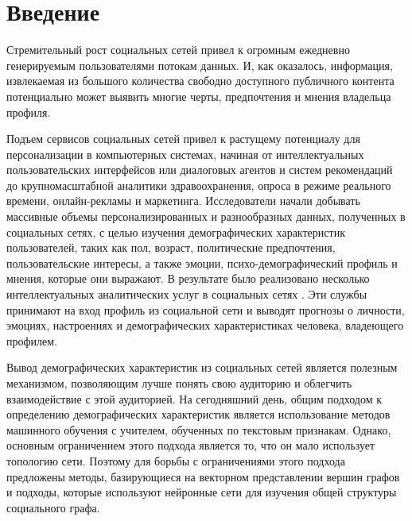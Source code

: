 \section{Введение}
Стремительный рост социальных сетей привел к огромным ежедневно генерируемым пользователями потокам данных. И, как оказалось, информация, извлекаемая из большого количества свободно доступного публичного контента потенциально может выявить многие черты, предпочтения и мнения владельца профиля.

Подъем сервисов социальных сетей привел к растущему потенциалу
для персонализации в компьютерных системах, начиная от
интеллектуальных пользовательских интерфейсов или диалоговых агентов и
систем рекомендаций до крупномасштабной аналитики здравоохранения,
опроса в режиме реального времени, онлайн-рекламы и маркетинга.
Исследователи начали добывать массивные объемы персонализированных и
разнообразных данных, полученных в социальных сетях, с целью изучения
демографических характеристик пользователей, таких как пол, возраст,
политические предпочтения, пользовательские
интересы, а также эмоции, психо-демографический профиль и мнения, которые они выражают. В результате
было реализовано несколько интеллектуальных аналитических услуг в
социальных сетях \cite{ApplyMagicSauce, PersonalityInsights}. Эти службы принимают на вход профиль из социальной
сети и выводят прогнозы о личности, эмоциях, настроениях и
демографических характеристиках человека, владеющего профилем.

Вывод демографических характеристик из социальных сетей является полезным механизмом, позволяющим лучше понять свою аудиторию и облегчить взаимодействие с этой аудиторией.  На сегодняшний день, общим подходом к определению демографических характеристик является использование методов машинного обучения с учителем, обученных по текстовым признакам. Однако, основным ограничением этого подхода является то, что он мало использует топологию сети. Поэтому для борьбы с ограничениями этого подхода предложены методы, базирующиеся на векторном представлении вершин графов и подходы, которые используют нейронные сети для изучения общей структуры социального графа.

\clearpage